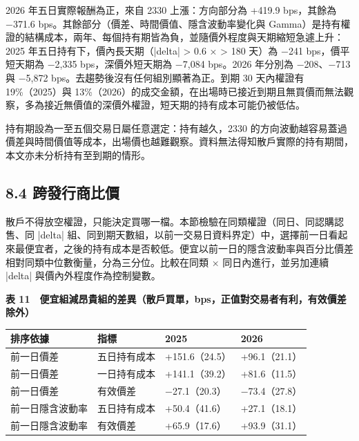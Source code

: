 \documentclass[12pt,a4paper]{article}
\begin{document}
2026 年五日實際報酬為正，來自 2330 上漲：方向部分為 +419.9 bps，其餘為 −371.6 bps。其餘部分（價差、時間價值、隱含波動率變化與 Gamma）是持有權證的結構成本，兩年、每個持有期皆為負，並隨價外程度與天期縮短急遽上升：2025 年五日持有下，價內長天期（|delta| > 0.6 × > 180 天）為 −241 bps，價平短天期為 −2,335 bps，深價外短天期為 −7,084 bps。2026 年分別為 −208、−713 與 −5,872 bps。去趨勢後沒有任何組別顯著為正。到期 30 天內權證有 19\%（2025）與 13\%（2026）的成交金額，在出場時已接近到期且無買價而無法觀察，多為接近無價值的深價外權證，短天期的持有成本可能仍被低估。

持有期設為一至五個交易日屬任意選定：持有越久，2330 的方向波動越容易蓋過價差與時間價值等成本，出場價也越難觀察。資料無法得知散戶實際的持有期間，本文亦未分析持有至到期的情形。

\subsection*{8.4 跨發行商比價}

散戶不得放空權證，只能決定買哪一檔。本節檢驗在同類權證（同日、同認購認售、同 |delta| 組、同到期天數組，以前一交易日資料界定）中，選擇前一日看起來最便宜者，之後的持有成本是否較低。便宜以前一日的隱含波動率與百分比價差相對同類中位數衡量，分為三分位。比較在同類 × 同日內進行，並另加連續 |delta| 與價內外程度作為控制變數。

\begin{center}\textbf{表 11　便宜組減昂貴組的差異（散戶買單，bps，正值對交易者有利，有效價差除外）}\end{center}\vspace{-0.8em}

\begin{center}\small
\begin{tabularx}{\linewidth}{Ylll}
\toprule
\textbf{排序依據} & \textbf{指標} & \textbf{2025} & \textbf{2026} \\
\midrule
前一日價差 & 五日持有成本 & +151.6（24.5） & +96.1（21.1） \\
前一日價差 & 一日持有成本 & +141.1（39.2） & +81.6（11.5） \\
前一日價差 & 有效價差 & −27.1（20.3） & −73.4（27.8） \\
前一日隱含波動率 & 五日持有成本 & +50.4（41.6） & +27.1（18.1） \\
前一日隱含波動率 & 有效價差 & +65.9（17.6） & +93.9（31.1） \\
\bottomrule
\end{tabularx}
\end{center}
\end{document}
